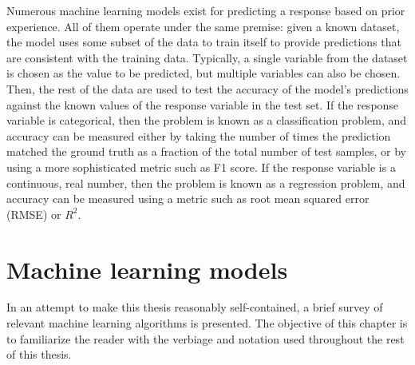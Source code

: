 Numerous machine learning models exist for predicting a response based on prior experience.  All of them operate under the same premise: given a known dataset, the model uses some subset of the data to train itself to provide predictions that are consistent with the training data.  Typically, a single variable from the dataset is chosen as the value to be predicted, but multiple variables can also be chosen.  Then, the rest of the data are used to test the accuracy of the model's predictions against the known values of the response variable in the test set.  If the response variable is categorical, then the problem is known as a classification problem, and accuracy can be measured either by taking the number of times the prediction matched the ground truth as a fraction of the total number of test samples, or by using a more sophisticated metric such as F1 score.  If the response variable is a continuous, real number, then the problem is known as a regression problem, and accuracy can be measured using a metric such as root mean squared error (RMSE) or $R^2$.

\section{Machine learning models}

In an attempt to make this thesis reasonably self-contained, a brief survey of relevant machine learning algorithms is presented.  The objective of this chapter is to familiarize the reader with the verbiage and notation used throughout the rest of this thesis.

